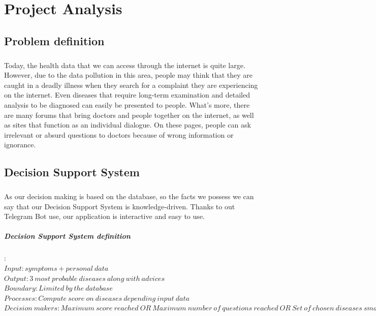 \chapter{Project Analysis} 

\section{Problem definition}

\paragraph{}
Today, the health data that we can access through the internet is quite large. However, due to the data pollution in this area, people may think that they are	caught	in	a	deadly	illness when	they	search	for	a	complaint	they	are	experiencing	on	the	internet.	Even	diseases	that require	long-term	examination	and	detailed	analysis	to	be	diagnosed	can	easily	be	presented to	people.	What's	more,	there	are	many	forums	that	bring	doctors	and	people	together	on	the	internet,	as	well	as	sites	that	function	as	an	individual	dialogue.	On	these	pages,	people	can	ask	irrelevant	or	absurd	questions	to	doctors	because	of	wrong	information	or	ignorance. 

\section{Decision Support System}

\paragraph{}
As our decision making is based on the database, so the facts we possess we can say that our Decision Support System is knowledge-driven. Thanks to out Telegram Bot use, our application is interactive and easy to use.

\paragraph{Decision Support System definition}:\\
$Input: symptoms + personal\ data$\\
$Output: 3\ most\ probable\ diseases\ along\ with\ advices$\\
$Boundary: Limited\ by\ the\ database$\\
$Processes: Compute\ score\ on\ diseases\ depending\ input\ data$\\
$Decision\ makers: Maximum\ score\ reached\ OR\ Maximum\ number\ of\ questions\ reached\ OR\ Set\ of\ chosen\ diseases\ small\ enough$\\


